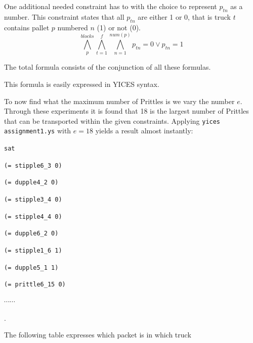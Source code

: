 \documentclass[12pt]{article}
\begin{document}
One additional needed constraint has to with the choice to represent $p_{tn}$
as a number. This constraint states that all $p_{tn}$ are either 1 or 0, that is
truck $t$ contains pallet $p$ numbered $n$ (1) or not (0).
\begin{equation} \label{eq:range}
  \bigwedge_p^{blocks} \bigwedge_{t=1}^f \bigwedge_{n=1}^{num(p)} 
	p_{tn} = 0 \vee p_{tn} = 1
\end{equation}

The total formula consists of the conjunction of all these formulas.

This formula is easily expressed in YICES syntax.

To now find what the maximum number of Prittles is we vary the number $e$. 
Through these experiments it is found that 18 is the largest number of Prittles
that can be transported within the given constraints.
Applying {\tt yices assignment1.ys} with $e=18$ yields a result almost 
instantly:

{\footnotesize

{\tt sat }

{\tt (= stipple6\_3 0)}

{\tt (= dupple4\_2 0)}

{\tt (= stipple3\_4 0)}

{\tt (= stipple4\_4 0)}

{\tt (= dupple6\_2 0)}

{\tt (= stipple1\_6 1)}

{\tt (= dupple5\_1 1)}

{\tt (= prittle6\_15 0)}

$\cdots \cdots$ }.

The following table expresses which packet is in which truck

\vspace{3mm}
\end{document}
